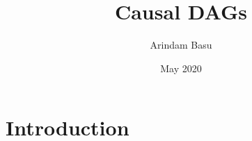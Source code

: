 \documentclass{article}
\title{Causal DAGs}
\author{Arindam Basu}
\date{May 2020}
\begin{document}
\maketitle

\section{Introduction}
\end{document}
